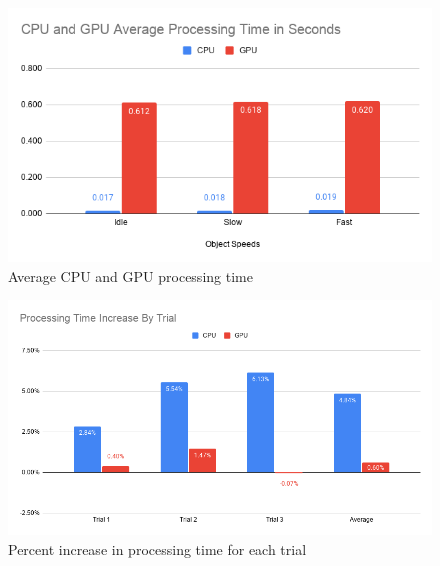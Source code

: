 \documentclass[conference]{IEEEtran}
\begin{document}
\begin{figure}[h!]
    \includegraphics[width=\linewidth]{CPU and GPU Average Processing Time in Seconds.png}
    \caption{Average CPU and GPU processing time}
    \label{fig:Performance of Original Pencil Drawing Program}
\end{figure}
\begin{figure}[h!]
    \includegraphics[width=\linewidth]{Processing Time Increase By Trial.png}
    \caption{Percent increase in processing time for each trial}
    \label{fig:Performance of Original Pencil Drawing Program}
\end{figure}
\end{document}
